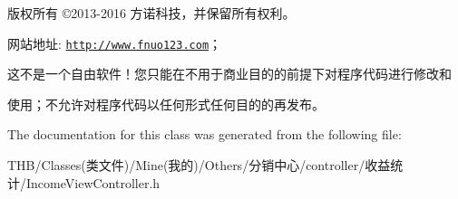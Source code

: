 版权所有 ©2013-\/2016 方诺科技，并保留所有权利。

网站地址\+: \href{http://www.fnuo123.com}{\tt http\+://www.\+fnuo123.\+com}； 



这不是一个自由软件！您只能在不用于商业目的的前提下对程序代码进行修改和

使用；不允许对程序代码以任何形式任何目的的再发布。 

 

The documentation for this class was generated from the following file\+:\begin{DoxyCompactItemize}
\item 
T\+H\+B/\+Classes(类文件)/\+Mine(我的)/\+Others/分销中心/controller/收益统计/Income\+View\+Controller.\+h\end{DoxyCompactItemize}
